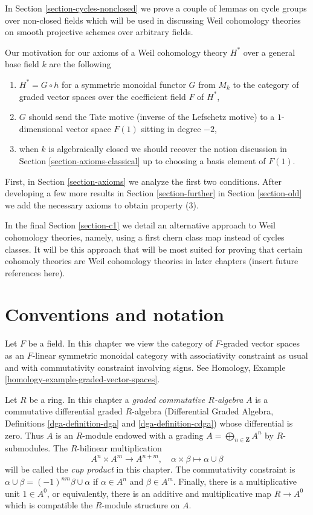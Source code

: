 \medskip\noindent
In Section \ref{section-cycles-nonclosed} we prove a couple of lemmas
on cycle groups over non-closed fields which will be used in discussing
Weil cohomology theories on smooth projective schemes over arbitrary fields.

\medskip\noindent
Our motivation for our axioms of a Weil cohomology theory $H^*$
over a general base field $k$ are the following
\begin{enumerate}
\item $H^* = G \circ h$ for a symmetric monoidal functor $G$ from $M_k$
to the category of graded vector spaces over the coefficient field $F$ of $H^*$,
\item $G$ should send the Tate motive (inverse of the Lefschetz motive)
to a $1$-dimensional vector space $F(1)$ sitting in degree $-2$,
\item when $k$ is algebraically closed we should recover the notion
discussion in Section \ref{section-axioms-classical}
up to choosing a basis element of $F(1)$.
\end{enumerate}
First, in Section \ref{section-axioms} we analyze the first two conditions.
After developing a few more results in Section \ref{section-further}
in Section \ref{section-old} we add the necessary axioms to obtain
property (3).

\medskip\noindent
In the final Section \ref{section-c1} we detail an alternative approach
to Weil cohomology theories, namely, using a first chern class map
instead of cycles classes. It will be this approach that will be most
suited for proving that certain cohomoly theories are Weil cohomology
theories in later chapters (insert future references here).





\section{Conventions and notation}
\label{section-conventions}

\noindent
Let $F$ be a field. In this chapter we view the category of $F$-graded vector
spaces as an $F$-linear symmetric monoidal category with associativity
constraint as usual and with commutativity constraint involving signs.
See Homology, Example \ref{homology-example-graded-vector-spaces}.

\medskip\noindent
Let $R$ be a ring. In this chapter a
{\it graded commutative $R$-algebra} $A$ is a
commutative differential graded $R$-algebra
(Differential Graded Algebra, Definitions \ref{dga-definition-dga} and
\ref{dga-definition-cdga}) whose differential is zero. Thus $A$
is an $R$-module endowed with a grading
$A = \bigoplus_{n \in \mathbf{Z}} A^n$ by
$R$-submodules. The $R$-bilinear multiplication
$$
A^n \times A^m \longrightarrow A^{n + m},\quad
\alpha \times \beta \longmapsto \alpha \cup \beta
$$
will be called the {\it cup product} in this chapter.
The commutativity constraint is
$\alpha \cup \beta = (-1)^{nm} \beta \cup \alpha$ if
$\alpha \in A^n$ and $\beta \in A^m$. Finally, there is
a multiplicative unit $1 \in A^0$, or equivalently, there is an
additive and multiplicative map $R \to A^0$ which is compatible the
$R$-module structure on $A$.

